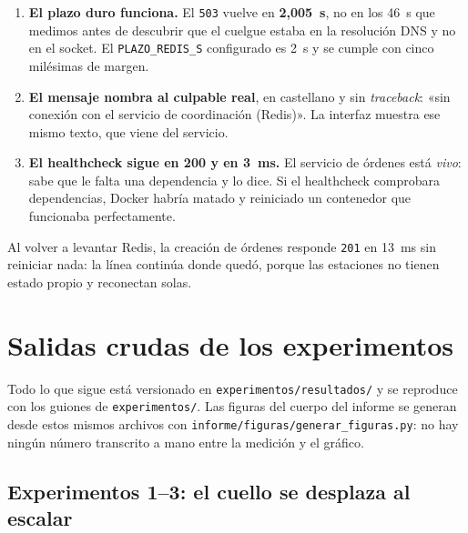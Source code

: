 \documentclass[12pt,a4paper]{article}
\begin{document}
\begin{enumerate}[leftmargin=*, itemsep=2pt]
  \item \textbf{El plazo duro funciona.} El \texttt{503} vuelve en
        \textbf{2,005~s}, no en los 46~s que medimos antes de descubrir que el
        cuelgue estaba en la resolución DNS y no en el socket. El
        \texttt{PLAZO\_REDIS\_S} configurado es 2~s y se cumple con cinco
        milésimas de margen.
  \item \textbf{El mensaje nombra al culpable real}, en castellano y sin
        \emph{traceback}: «sin conexión con el servicio de coordinación
        (Redis)». La interfaz muestra ese mismo texto, que viene del servicio.
  \item \textbf{El healthcheck sigue en 200 y en 3~ms.} El servicio de órdenes
        está \emph{vivo}: sabe que le falta una dependencia y lo dice. Si el
        healthcheck comprobara dependencias, Docker habría matado y reiniciado
        un contenedor que funcionaba perfectamente.
\end{enumerate}

Al volver a levantar Redis, la creación de órdenes responde \texttt{201} en 13~ms
sin reiniciar nada: la línea continúa donde quedó, porque las estaciones no
tienen estado propio y reconectan solas.

\newpage
\section{Salidas crudas de los experimentos}
\label{anexo:crudos}

Todo lo que sigue está versionado en \texttt{experimentos/resultados/} y se
reproduce con los guiones de \texttt{experimentos/}. Las figuras del cuerpo del
informe se generan desde estos mismos archivos con
\texttt{informe/figuras/generar\_figuras.py}: no hay ningún número transcrito a
mano entre la medición y el gráfico.

\subsection{Experimentos 1--3: el cuello se desplaza al escalar}
\end{document}
